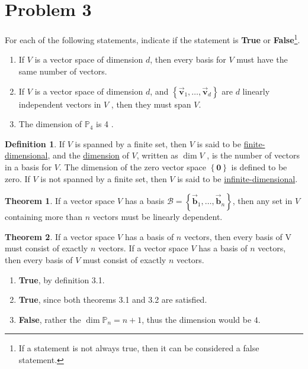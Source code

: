 \documentclass[letter,11pt]{article}
\theoremstyle{definition}
\newtheorem{definition}{Definition}[section]
\newtheorem{theorem}{Theorem}[section]
\begin{document}
\section{Problem 3}
 For each of the following statements, indicate if the statement is \textbf{True} or \textbf{False}\footnote{ If a statement is not always true, then it can be considered a false statement.}.
\begin{enumerate}[label = \roman*.]
    \item If $V$ is a vector space of dimension $d$, then every basis for $V$ must have the same number of vectors.
    \item If $V$ is a vector space of dimension $d$, and $\left\{\vec{\boldsymbol{v}}_{1}, \ldots, \vec{\boldsymbol{v}}_{d}\right\}$ are $d$ linearly independent vectors in $V$ , then they must span $V$.
    \item The dimension of $\mathbb{P}_{4}$ is 4 .
\end{enumerate}

\begin{tcolorbox}[boxrule=1mm,enhanced jigsaw, breakable,before=\hfill,after=\hfill,adjusted title={Problem 3 solutions}]
    \begin{definition}
        If $V$ is spanned by a finite set, then $V$ is said to be \underline{finite-dimensional}, and the \underline{dimension} of $V$, written as $\operatorname{dim} V$ , is the number of vectors in a basis for $V$. The dimension of the zero vector space $\left\{\boldsymbol{0}\right\}$ is defined to be zero. If $V$ is not spanned by a finite set, then $V$ is said to be \underline{infinite-dimensional}.
    \end{definition}
    \begin{theorem}
         If a vector space $V$ has a basis $\mathcal{B} = \left\{\vec{\boldsymbol{b}}_1, \ldots, \vec{\boldsymbol{b}}_n\right\}$, then any set in $V$ containing more than $n$ vectors must be linearly dependent.
    \end{theorem}
    \begin{theorem}
        If a vector space $V$ has a basis of $n$ vectors, then every basis of V must consist of exactly $n$ vectors. If a vector space $V$ has a basis of $n$ vectors, then every basis of $V$ must consist of exactly $n$ vectors.
    \end{theorem}
    \tcblower
    \begin{enumerate}
        \item \textbf{True}, by definition 3.1.
        \item \textbf{True}, since both theorems 3.1 and 3.2 are satisfied. 
        \item \textbf{False}, rather the $\operatorname{dim}\mathbb{P}_{n} = n+1$, thus the dimension would be $4$.
    \end{enumerate}
\end{tcolorbox}
\newpage
\end{document}
